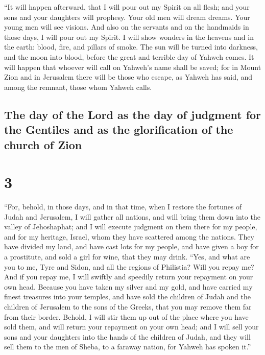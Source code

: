  ``It will happen afterward, that I will pour out my
Spirit on all flesh; and your sons and your daughters will prophesy.
Your old men will dream dreams. Your young men will see visions.
 And also on the servants and on the handmaids in those
days, I will pour out my Spirit.  I will show wonders in
the heavens and in the earth: blood, fire, and pillars of smoke.
 The sun will be turned into darkness, and the moon into
blood, before the great and terrible day of Yahweh comes.
 It will happen that whoever will call on Yahweh's name
shall be saved; for in Mount Zion and in Jerusalem there will be those
who escape, as Yahweh has said, and among the remnant, those whom Yahweh
calls.

\hypertarget{the-day-of-the-lord-as-the-day-of-judgment-for-the-gentiles-and-as-the-glorification-of-the-church-of-zion}{%
\subsection{The day of the Lord as the day of judgment for the Gentiles
and as the glorification of the church of
Zion}\label{the-day-of-the-lord-as-the-day-of-judgment-for-the-gentiles-and-as-the-glorification-of-the-church-of-zion}}

\hypertarget{section-2}{%
\section{3}\label{section-2}}

 ``For, behold, in those days, and in that time, when I
restore the fortunes of Judah and Jerusalem,  I will
gather all nations, and will bring them down into the valley of
Jehoshaphat; and I will execute judgment on them there for my people,
and for my heritage, Israel, whom they have scattered among the nations.
They have divided my land,  and have cast lots for my
people, and have given a boy for a prostitute, and sold a girl for wine,
that they may drink.  ``Yes, and what are you to me, Tyre
and Sidon, and all the regions of Philistia? Will you repay me? And if
you repay me, I will swiftly and speedily return your repayment on your
own head.  Because you have taken my silver and my gold,
and have carried my finest treasures into your temples, 
and have sold the children of Judah and the children of Jerusalem to the
sons of the Greeks, that you may remove them far from their border.
 Behold, I will stir them up out of the place where you
have sold them, and will return your repayment on your own head;
 and I will sell your sons and your daughters into the
hands of the children of Judah, and they will sell them to the men of
Sheba, to a faraway nation, for Yahweh has spoken it.''


